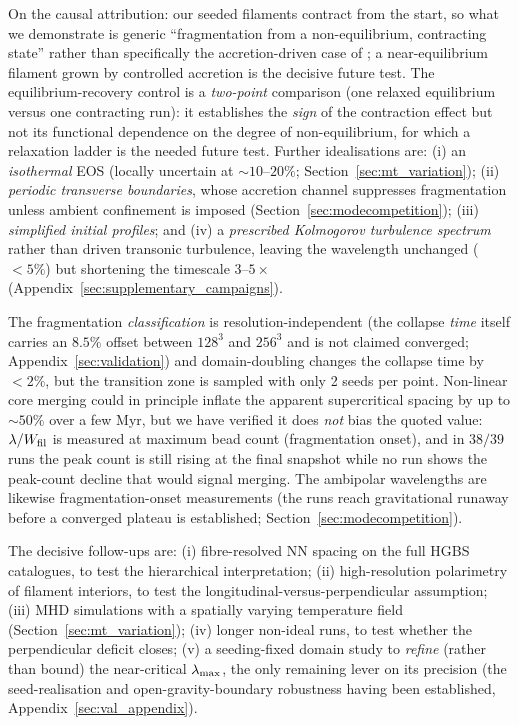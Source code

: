 \documentclass[usenatbib,twoside,twocolumn]{mnras}
\begin{document}
On the causal attribution: our seeded filaments contract from the start, so what we demonstrate is generic ``fragmentation from a non-equilibrium, contracting state'' rather than specifically the accretion-driven case of \citet{Clarke2016,Clarke2017}; a near-equilibrium filament grown by controlled accretion is the decisive future test. The equilibrium-recovery control is a \emph{two-point} comparison (one relaxed equilibrium versus one contracting run): it establishes the \emph{sign} of the contraction effect but not its functional dependence on the degree of non-equilibrium, for which a relaxation ladder is the needed future test. Further idealisations are: (i) an \emph{isothermal} EOS (locally uncertain at $\sim10$--$20\%$; Section~\ref{sec:mt_variation}); (ii) \emph{periodic transverse boundaries}, whose accretion channel suppresses fragmentation unless ambient confinement is imposed (Section~\ref{sec:modecompetition}); (iii) \emph{simplified initial profiles}; and (iv) a \emph{prescribed Kolmogorov turbulence spectrum} rather than driven transonic turbulence, leaving the wavelength unchanged ($<5\%$) but shortening the timescale $3$--$5\times$ (Appendix~\ref{sec:supplementary_campaigns}).

The fragmentation \emph{classification} is resolution-independent (the collapse \emph{time} itself carries an $8.5\%$ offset between $128^3$ and $256^3$ and is not claimed converged; Appendix~\ref{sec:validation}) and domain-doubling changes the collapse time by $<2\%$, but the transition zone is sampled with only 2 seeds per point. Non-linear core merging could in principle inflate the apparent supercritical spacing by up to $\sim50\%$ over a few Myr, but we have verified it does \emph{not} bias the quoted value: $\lambda/W_{\rm fil}$ is measured at maximum bead count (fragmentation onset), and in $38/39$ runs the peak count is still rising at the final snapshot while no run shows the peak-count decline that would signal merging. The ambipolar wavelengths are likewise fragmentation-onset measurements (the runs reach gravitational runaway before a converged plateau is established; Section~\ref{sec:modecompetition}).

The decisive follow-ups are: (i) fibre-resolved NN spacing on the full HGBS catalogues, to test the hierarchical interpretation; (ii) high-resolution polarimetry of filament interiors, to test the longitudinal-versus-perpendicular assumption; (iii) MHD simulations with a spatially varying temperature field (Section~\ref{sec:mt_variation}); (iv) longer non-ideal runs, to test whether the perpendicular deficit closes; (v) a seeding-fixed domain study to \emph{refine} (rather than bound) the near-critical $\lambda_{\rm max}$, the only remaining lever on its precision (the seed-realisation and open-gravity-boundary robustness having been established, Appendix~\ref{sec:val_appendix}).
\end{document}
